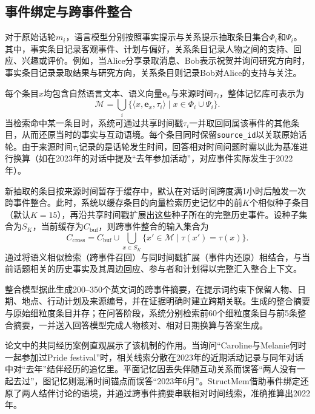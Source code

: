 \subsection{事件绑定与跨事件整合}

对于原始话轮$m_i$，语言模型分别按照事实提示与关系提示抽取条目集合$\Phi_i$和$\Psi_i$。其中，事实条目记录客观事件、计划与偏好，关系条目记录人物之间的支持、回应、兴趣或评价。例如，当Alice分享录取消息、Bob表示祝贺并询问研究方向时，事实条目记录录取结果与研究方向，关系条目则记录Bob对Alice的支持与关注。

每个条目$x$均包含自然语言文本、语义向量$\mathbf e_x$与来源时间$\tau_i$，整体记忆库可表示为
\begin{equation}
\mathcal M=\bigcup_i\{\langle x,\mathbf e_x,\tau_i\rangle\mid x\in\Phi_i\cup\Psi_i\}.
\end{equation}
当检索命中某一条目时，系统可通过共享时间戳$\tau_i$一并取回同属该事件的其他条目，从而还原当时的事实与互动语境。每个条目同时保留\texttt{source\_id}以关联原始话轮。由于来源时间$\tau_i$记录的是话轮发生时间，回答相对时间问题时需以此为基准进行换算（如在2023年的对话中提及“去年参加活动”，对应事件实际发生于2022年）。

新抽取的条目按来源时间暂存于缓存中，默认在对话时间跨度满1小时后触发一次跨事件整合。此时，系统以缓存条目的向量检索历史记忆中的前$K$个相似种子条目（默认$K=15$），再沿共享时间戳扩展出这些种子所在的完整历史事件。设种子集合为$S_K$，当前缓存为$C_{\mathrm{buf}}$，则跨事件整合的输入集合为
\begin{equation}
C_{\mathrm{cross}}=C_{\mathrm{buf}}\cup\bigcup_{x\in S_K}\{x'\in\mathcal M\mid\tau(x')=\tau(x)\}.
\end{equation}
通过将语义相似检索（跨事件召回）与同时间戳扩展（事件内还原）相结合，与当前话题相关的历史事实及其周边回应、参与者和计划得以完整汇入整合上下文。

整合模型据此生成200--350个英文词的跨事件摘要，在提示词约束下保留人物、日期、地点、行动计划及来源编号，并在证据明确时建立跨期关联。生成的整合摘要与原始细粒度条目并存；在问答阶段，系统分别检索前60个细粒度条目与前5条整合摘要，一并送入回答模型完成人物核对、相对日期换算与答案生成。

论文中的共同经历案例直观展示了该机制的作用。当询问“Caroline与Melanie何时一起参加过Pride festival”时，相关线索分散在2023年的近期活动记录与同年对话中对“去年”结伴经历的追忆里。平面记忆因丢失伴随互动关系而误答“两人没有一起去过”，图记忆则混淆时间锚点而误答“2023年6月”。StructMem借助事件绑定还原了两人结伴讨论的语境，并通过跨事件摘要串联相对时间线索，准确推算出2022年。

